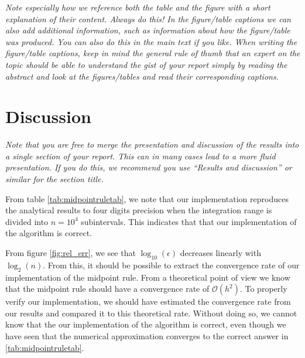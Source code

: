 \documentclass[english,notitlepage,reprint,nofootinbib]{revtex4-1}  %
\begin{document}

\textit{Note especially how we reference both the table and the figure with a short explanation of their content. Always do this! In the figure/table captions we can also add additional information, such as information about how the figure/table was produced. You can also do this in the main text if you like. When writing the figure/table captions, keep in mind the general rule of thumb that an expert on the topic should be able to understand the gist of your report simply by reading the abstract and look at the figures/tables and read their corresponding captions.}


\section{Discussion}\label{sec:discussion}
%
\textit{Note that you are free to merge the presentation and discussion of the results into a single section of your report. This can in many cases lead to a more fluid presentation. If you do this, we recommend you use ``Results and discussion'' or similar for the section title.}

From table \ref{tab:midpointruletab}, we note that our implementation reproduces the analytical results to four digits precision when the integration range is divided into $n = 10^4$ subintervals. This indicates that that our implementation of the algorithm is correct.

From figure \ref{fig:rel_err}, we see that $\log_{10}(\epsilon)$ decreases linearly with $\log_{2}(n)$. From this, it should be possible to extract the convergence rate of our implementation of the midpoint rule. From a theoretical point of view we know that the midpoint rule should have a convergence rate of $\mathcal{O}(h^2)$. To properly verify our implementation, we should have estimated the convergence rate from our results and compared it to this theoretical rate. Without doing so, we cannot know that the our implementation of the algorithm is correct, even though we have seen that the numerical approximation converges to the correct answer in \ref{tab:midpointruletab}.
\end{document}
